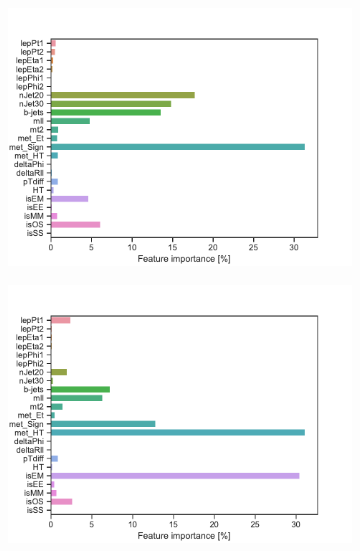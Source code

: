 \begin{figure}[H]
\begin{subfigure}[t!]{0.49\textwidth}
        \includegraphics[width = \textwidth]{Figures/WW/BDT/All_level/Inter/featureImportance.pdf}
        \caption{}
        \label{fig:featWWLow}
    \end{subfigure}
    \begin{subfigure}[t!]{0.49\textwidth}
        \includegraphics[width = \textwidth]{Figures/Mono_Z/ML/BDT/All_level/Inter/featureImportance.pdf}
        \caption{}
        \label{fig:featMonoZLow}
    \end{subfigure}
    \caption{}
    \label{fig:Non}
\end{figure}


